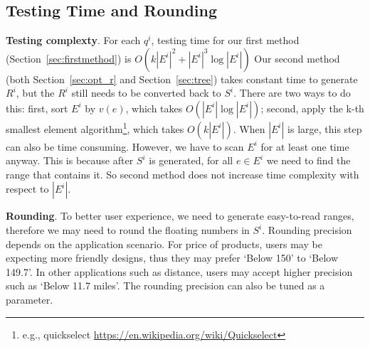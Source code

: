 \subsection{Testing Time and Rounding}
\label{sec:time}
\textbf{Testing complexty}. For each $q^i$, testing time for our first method (Section~\ref{sec:firstmethod}) is $O(k|E^i|^2 + |E^i|^3\log{|E^i|})$ Our second method (both Section~\ref{sec:opt_r} and Section~\ref{sec:tree}) takes constant time to generate $R^i$, but the $R^i$ still needs to be converted back to $S^i$. There are two ways to do this: first, sort $E^i$ by $v(e)$, which takes $O(|E^i|\log{|E^i|})$; second, apply the k-th smallest element algorithm\footnote{e.g., quickselect \url{https://en.wikipedia.org/wiki/Quickselect}}, which takes $O(k|E^i|)$. When $|E^i|$ is large, this step can also be time consuming. However, we have to scan $E^i$ for at least one time anyway. This is because after $S^i$ is generated, for all $e\in E^i$ we need to find the range that contains it. So second method does not increase time complexity with respect to $|E^i|$. 

\textbf{Rounding}. To better user experience, we need to generate easy-to-read ranges, therefore we may need to round the floating numbers in $S^i$. Rounding precision depends on the application scenario. For price of products, users may be expecting more friendly designs, thus they may prefer `Below 150' to `Below 149.7'. In other applications such as distance, users may accept higher precision such as `Below 11.7 miles'. The rounding precision can also be tuned as a parameter. 



